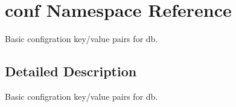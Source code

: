 \hypertarget{namespaceconf}{}\section{conf Namespace Reference}
\label{namespaceconf}


Basic configration key/value pairs for db.  




\subsection{Detailed Description}
Basic configration key/value pairs for db. 